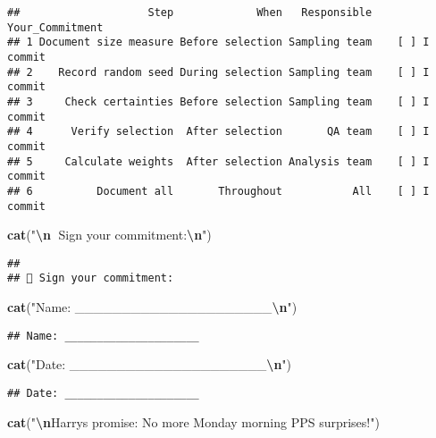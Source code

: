 \documentclass[
]{article}
\newenvironment{Shaded}{\begin{snugshade}}{\end{snugshade}}
\newcommand{\FunctionTok}[1]{\textcolor[rgb]{0.13,0.29,0.53}{\textbf{#1}}}
\newcommand{\NormalTok}[1]{#1}
\newcommand{\SpecialCharTok}[1]{\textcolor[rgb]{0.81,0.36,0.00}{\textbf{#1}}}
\newcommand{\StringTok}[1]{\textcolor[rgb]{0.31,0.60,0.02}{#1}}
\begin{document}
\begin{verbatim}
##                    Step             When   Responsible Your_Commitment
## 1 Document size measure Before selection Sampling team    [ ] I commit
## 2    Record random seed During selection Sampling team    [ ] I commit
## 3     Check certainties Before selection Sampling team    [ ] I commit
## 4      Verify selection  After selection       QA team    [ ] I commit
## 5     Calculate weights  After selection Analysis team    [ ] I commit
## 6          Document all       Throughout           All    [ ] I commit
\end{verbatim}

\begin{Shaded}
\begin{Highlighting}[]
\FunctionTok{cat}\NormalTok{(}\StringTok{"}\SpecialCharTok{\textbackslash{}n}\StringTok{📝 Sign your commitment:}\SpecialCharTok{\textbackslash{}n}\StringTok{"}\NormalTok{)}
\end{Highlighting}
\end{Shaded}

\begin{verbatim}
## 
## 📝 Sign your commitment:
\end{verbatim}

\begin{Shaded}
\begin{Highlighting}[]
\FunctionTok{cat}\NormalTok{(}\StringTok{"Name: \_\_\_\_\_\_\_\_\_\_\_\_\_\_\_\_\_\_\_\_\_}\SpecialCharTok{\textbackslash{}n}\StringTok{"}\NormalTok{)}
\end{Highlighting}
\end{Shaded}

\begin{verbatim}
## Name: _____________________
\end{verbatim}

\begin{Shaded}
\begin{Highlighting}[]
\FunctionTok{cat}\NormalTok{(}\StringTok{"Date: \_\_\_\_\_\_\_\_\_\_\_\_\_\_\_\_\_\_\_\_\_}\SpecialCharTok{\textbackslash{}n}\StringTok{"}\NormalTok{)}
\end{Highlighting}
\end{Shaded}

\begin{verbatim}
## Date: _____________________
\end{verbatim}

\begin{Shaded}
\begin{Highlighting}[]
\FunctionTok{cat}\NormalTok{(}\StringTok{"}\SpecialCharTok{\textbackslash{}n}\StringTok{Harry\textquotesingle{}s promise: No more Monday morning PPS surprises!"}\NormalTok{)}
\end{Highlighting}
\end{Shaded}
\end{document}
